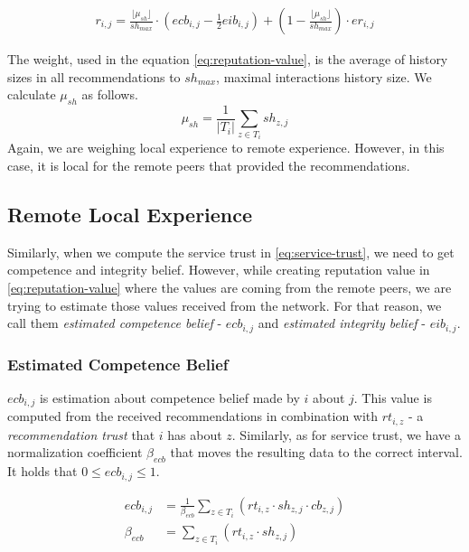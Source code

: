 \begin{equation}
\label{eq:reputation-value}
\begin{split}
    r_{i, j}=\frac{\lfloor\mu_{sh}\rfloor}{sh_{max}} \cdot \left(ecb_{i,j}-\frac{1}{2} eib_{i, j}\right) + \left(1-\frac{\lfloor\mu_{sh}\rfloor}{sh_{max}}\right) \cdot er_{i,j}
\end{split}
\end{equation}

\noindent
The weight, used in the equation \ref{eq:reputation-value}, is the average of history sizes in all recommendations to $sh_{max}$, maximal interactions history size. 
We calculate $\mu_{sh}$ as follows.
\begin{equation}
    \mu_{sh} = \frac{1}{|T_{i}|} \sum_{z \in T_{i}} sh_{z, j}
\end{equation}
\noindent
Again, we are weighing local experience to remote experience. However, in this case, it is local for the remote peers that provided the recommendations.

\subsection{Remote Local Experience}
\label{subsec:remote-local-experience}
Similarly, when we compute the service trust in \ref{eq:service-trust}, we need to get competence and integrity belief.
However, while creating reputation value in \ref{eq:reputation-value} where the values are coming from the remote peers, we are trying to estimate those values received from the network.
For that reason, we call them \textit{estimated competence belief} - $ecb_{i,j}$ and \textit{estimated integrity belief} - $eib_{i,j}$.

\subsubsection{Estimated Competence Belief}
$ecb_{i,j}$ is estimation about competence belief made by $i$ about $j$. 
This value is computed from the received recommendations in combination with $rt_{i,z}$ - a \textit{recommendation trust} that $i$ has about $z$.
Similarly, as for service trust, we have a normalization coefficient $\beta_{ecb}$ that moves the resulting data to the correct interval.
It holds that $0 \leq ecb_{i,j} \leq 1$.

\begin{equation}
\label{eq:estimated-competence-belief}
\begin{split}
    ecb_{i,j} &= \frac{1}{\beta_{ecb}} \sum_{z \in T_{i}} \left(rt_{i, z} \cdot sh_{z, j} \cdot cb_{z, j}\right) \\
    \beta_{ecb} &= \sum_{z \in T_{i}} \left(rt_{i, z} \cdot sh_{z, j}\right)
\end{split}
\end{equation}

